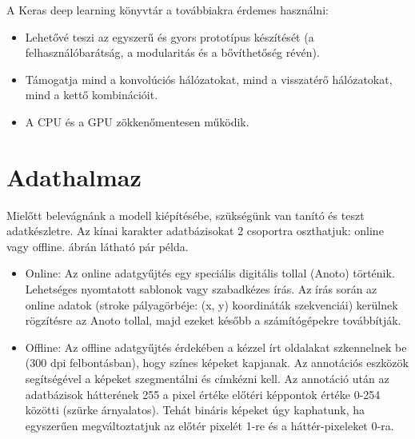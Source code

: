 A Keras deep learning könyvtár a továbbiakra érdemes használni:

\begin{itemize}
\item Lehetővé teszi az egyszerű és gyors prototípus készítését (a felhasználóbarátság, a modularitás és a bővíthetőség révén).
\item Támogatja mind a konvolúciós hálózatokat, mind a visszatérő hálózatokat, mind a kettő kombinációit.
\item A CPU és a GPU zökkenőmentesen működik.
\end{itemize}


\section{Adathalmaz}

Mielőtt belevágnánk a modell kiépítésébe, szükségünk van tanító és teszt adatkészletre. Az kínai karakter adatbázisokat 2 csoportra oszthatjuk: online vagy offline.  ábrán látható pár példa.
\begin{itemize}
\item Online: Az online adatgyűjtés egy speciális digitális tollal (Anoto) történik. Lehetséges nyomtatott sablonok vagy szabadkézes írás. Az írás során az online adatok (stroke pályagörbéje: (x, y) koordináták szekvenciái) kerülnek rögzítésre az Anoto tollal, majd ezeket később a számítógépekre továbbítják.
\item Offline: Az offline adatgyűjtés érdekében a kézzel írt oldalakat szkennelnek be (300 dpi felbontásban), hogy színes képeket kapjanak. Az annotációs eszközök segítségével a képeket szegmentálni és címkézni kell. Az annotáció után az adatbázisok hátterének 255 a pixel értéke előtéri képpontok értéke 0-254 közötti (szürke árnyalatos). Tehát bináris képeket úgy kaphatunk, ha egyszerűen megváltoztatjuk az előtér pixelét 1-re és a háttér-pixeleket 0-ra.
\end{itemize}

